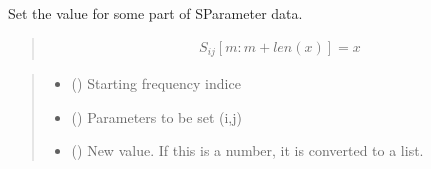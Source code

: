 \documentclass[letterpaper,10pt,english]{sphinxmanual}
\begin{document}
\begin{fulllineitems}
\begin{fulllineitems}
\begin{quote}
\begin{description}
\end{description}\end{quote}

\end{fulllineitems}


\begin{fulllineitems}
\label{\detokenize{touchstone:touchstone.spfile.setdata_format}}
\pysigstartsignatures
{}
\pysigstopsignatures
\end{fulllineitems}


\begin{fulllineitems}
\label{\detokenize{touchstone:touchstone.spfile.setdatapoint}}
\pysigstartsignatures
{}
\pysigstopsignatures
\sphinxAtStartPar
Set the value for some part of S\sphinxhyphen{}Parameter data.
\begin{quote}
\begin{equation*}
\begin{split}S_{i j}[m:m+len(x)]=x\end{split}
\end{equation*}\end{quote}
\begin{quote}\begin{description}
\begin{itemize}
\item {} 
\sphinxAtStartPar
{} () \textendash{} Starting frequency indice

\item {} 
\sphinxAtStartPar
{} () \textendash{} Parameters to be set (i,j)

\item {} 
\sphinxAtStartPar
{} () \textendash{} New value. If this is a number, it is converted to a list.


\end{itemize}
\end{description}
\end{quote}
\end{fulllineitems}
\end{fulllineitems}
\end{document}
